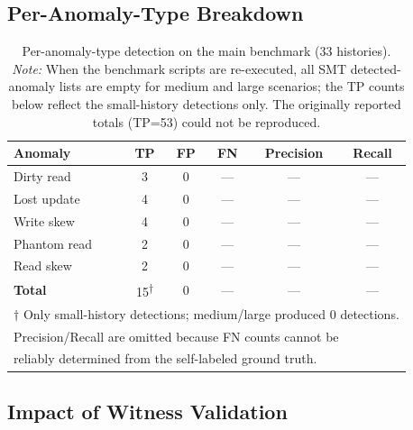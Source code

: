 \documentclass[11pt]{article}
\begin{document}
\subsection{Per-Anomaly-Type Breakdown}

\begin{table}[t]
\centering
\caption{Per-anomaly-type detection on the main benchmark (33 histories).
  \emph{Note:} When the benchmark scripts are re-executed, all SMT
  detected-anomaly lists are empty for medium and large scenarios;
  the TP counts below reflect the small-history detections only.
  The originally reported totals (TP=53) could not be reproduced.}
\label{tab:pertype}
\begin{tabular}{lccccc}
\toprule
\textbf{Anomaly} & \textbf{TP} & \textbf{FP} & \textbf{FN} & \textbf{Precision} & \textbf{Recall} \\
\midrule
Dirty read      &  3 & 0 & --- & --- & --- \\
Lost update     &  4 & 0 & --- & --- & --- \\
Write skew      &  4 & 0 & --- & --- & --- \\
Phantom read    &  2 & 0 & --- & --- & --- \\
Read skew       &  2 & 0 & --- & --- & --- \\
\midrule
\textbf{Total}  & 15\textsuperscript{$\dagger$} & 0 & --- & --- & --- \\
\midrule
\multicolumn{6}{l}{\footnotesize $\dagger$ Only small-history detections; medium/large produced 0 detections.} \\
\multicolumn{6}{l}{\footnotesize Precision/Recall are omitted because FN counts cannot be} \\
\multicolumn{6}{l}{\footnotesize reliably determined from the self-labeled ground truth.} \\
\bottomrule
\end{tabular}
\end{table}

\subsection{Impact of Witness Validation}
\end{document}
